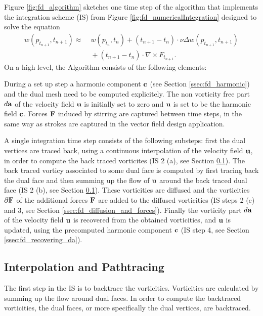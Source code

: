 Figure \ref{fig:fd_algorithm} sketches one time step of the algorithm that implements the integration scheme (IS) from Figure \ref{fig:fd_numericalIntegration} designed to solve the equation 
\begin{align*}w(p_{t_{n+1}},t_{n+1}) \approx \;& w(p_{t_n},t_n) + (t_{n+1}-t_n) \cdot \nu \Delta w(p_{t_{n+1}},t_{n+1}) \nonumber \\ &{}+ (t_{n+1}-t_n) \cdot\nabla \times F_{t_{n+1}}.\end{align*}
On a high level, the Algorithm consists of the following elements:

During a set up step a harmonic component $\textbf{c}$ (see Section \ref{ssec:fd_harmonic}) and the dual mesh need to be computed explicitely. The non vorticity free part $d\textbf{a}$ of the velocity field $\textbf{u}$ is initially set to zero and $\textbf{u}$ is set to be the harmonic field $\textbf{c}$. Forces $\textbf{F}$ induced by stirring are captured between time steps, in the same way as strokes are captured in the vector field design application.

A single integration time step consists of the following substeps: first the dual vertices are traced back, using a continuous interpolation of the velocity field $\textbf{u}$, in order to compute the back traced vorticites (IS 2 (a), see Section \ref{ssec:fd_interpolation_and_PT}). %
The back traced vorticy associated to some dual face is computed by first tracing back the dual face and then summing up the flow of $\textbf{u}$ around the back traced dual face (IS 2 (b), see Section \ref{ssec:fd_interpolation_and_PT}). These vorticities are diffused and the vorticities $\partial \textbf{F}$ of the additional forces $\textbf{F}$ are added to the diffused vorticities (IS steps 2 (c) and 3, see Section \ref{ssec:fd_diffusion_and_forces}). Finally the vorticity part $d\textbf{a}$ of the velocity field $\textbf{u}$ is recovered from the obtained vorticities, and $\textbf{u}$ is updated, using the precomputed harmonic component $\textbf{c}$ (IS step 4, see Section \ref{ssec:fd_recovering_da}).


\subsection{Interpolation and Pathtracing}
\label{ssec:fd_interpolation_and_PT}

The first step in the IS is to backtrace the vorticities. Vorticities are calculated by summing up the flow around dual faces. In order to compute the backtraced vorticities, the dual faces, or more specifically the dual vertices, are backtraced. 

